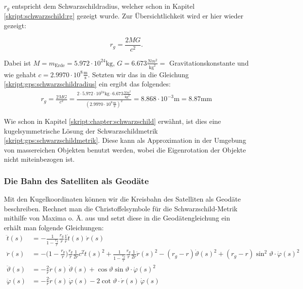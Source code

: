 \begin{refsection}
\noindent{}$r_g$ entspricht dem Schwarzschildradius, welcher schon in Kapitel \ref{skript:schwarzschild:rg} gezeigt wurde. Zur Übersichtlichkeit wird er hier wieder gezeigt:

\begin{equation}
r_g=\frac{2MG}{c^2}.
\label{skript:gps:schwarzschildradius}
\end{equation}

\noindent{}Dabei ist \( M = m_{\text{Erde}} = 5.972 \cdot 10^{24}\text{kg} \), \( G = 6.673 \frac{Nm^2}{\text{kg}^2} = \) Gravitationskonstante und wie gehabt \( c = 2.9970 \cdot 10^8 \frac{\text{m}}{\text{s}} \). Setzten wir das in die Gleichung \eqref{skript:gps:schwarzschildradius} ein ergibt das folgendes:\\
\begin{align*}
r_g=\frac{2MG}{c^2} = \frac{2 \cdot 5.972 \cdot 10^{24}\text{kg} \cdot 6.673 \frac{Nm^2}{\text{kg}^2}}{ (2.9970 \cdot 10^8 \frac{\text{m}}{\text{s}})^2} = 8.868 \cdot 10^{-3}\text{m} = 8.87\text{mm}
\end{align*}

Wie schon in Kapitel \ref{skript:chapter:schwarzschild} erwähnt, ist dies eine kugelsymmetrische Lösung der Schwarzschildmetrik \eqref{skript:gps:schwarzschildmetrik}. Diese kann als Approximation in der Umgebung von massereichen Objekten benutzt werden, wobei die Eigenrotation der Objekte nicht miteinbezogen ist.

\subsubsection{Die Bahn des Satelliten als Geodäte}
Mit den Kugelkoordinaten können wir die Kreisbahn des Satelliten als Geodäte beschreiben. Rechnet man die Christoffelsymbole für die Schwarzschild-Metrik mithilfe von Maxima o. Ä. aus und setzt diese in die Geodätengleichung ein erhält man folgende Gleichungen:
\begin{align*}
\ddot t(s)
&=
-\frac{1}{1-\displaystyle\frac{r_g}{r}}\frac{r_g}{r}\frac{1}{r}\dot t(s)\,\dot r(s)
\\
\ddot r(s)
&=
-\biggl(1-\frac{r_g}{r}\biggr)\frac{r_g}{r}\frac1{2r}c^2\dot t(s)^2
+\frac{1}{1-\displaystyle\frac{r_g}{r}} \frac{r_g}{r}\frac1{2r}\dot r(s)^2
-(r_g-r)\dot \vartheta(s)^2 + (r_g-r)\sin^2 \vartheta \cdot \dot \varphi(s)^2
\\
\ddot \vartheta(s)
&=
-\frac{2}{r} \dot r(s)\, \dot \vartheta(s)
+\cos\vartheta\sin\vartheta \cdot \dot\varphi(s)^2
\\
\ddot \varphi(s)
&=
-\frac{2}{r} \dot r(s)\,\dot \varphi(s)
-2\cot\vartheta \cdot \dot r(s)\,\dot\varphi(s)
\end{align*}


\end{refsection}
